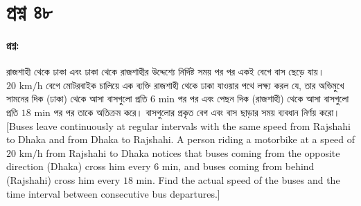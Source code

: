 \documentclass{article}
\begin{document}
\section*{প্রশ্ন ৪৮}

\paragraph{প্রশ্ন:} 
রাজশাহী থেকে ঢাকা এবং ঢাকা থেকে রাজশাহীর উদ্দেশ্যে নির্দিষ্ট সময় পর পর একই বেগে বাস ছেড়ে যায়। $20\text{ km/h}$ বেগে মোটরবাইক চালিয়ে এক ব্যক্তি রাজশাহী থেকে ঢাকা যাওয়ার পথে লক্ষ্য করল যে, তার অভিমুখে সামনের দিক (ঢাকা) থেকে আসা বাসগুলো প্রতি $6\text{ min}$ পর পর এবং পেছন দিক (রাজশাহী) থেকে আসা বাসগুলো প্রতি $18\text{ min}$ পর পর তাকে অতিক্রম করে। বাসগুলোর প্রকৃত বেগ এবং বাস ছাড়ার সময় ব্যবধান নির্ণয় করো। 
[Buses leave continuously at regular intervals with the same speed from Rajshahi to Dhaka and from Dhaka to Rajshahi. A person riding a motorbike at a speed of $20\text{ km/h}$ from Rajshahi to Dhaka notices that buses coming from the opposite direction (Dhaka) cross him every $6\text{ min}$, and buses coming from behind (Rajshahi) cross him every $18\text{ min}$. Find the actual speed of the buses and the time interval between consecutive bus departures.]

\begin{center}
\end{center}
\end{document}
